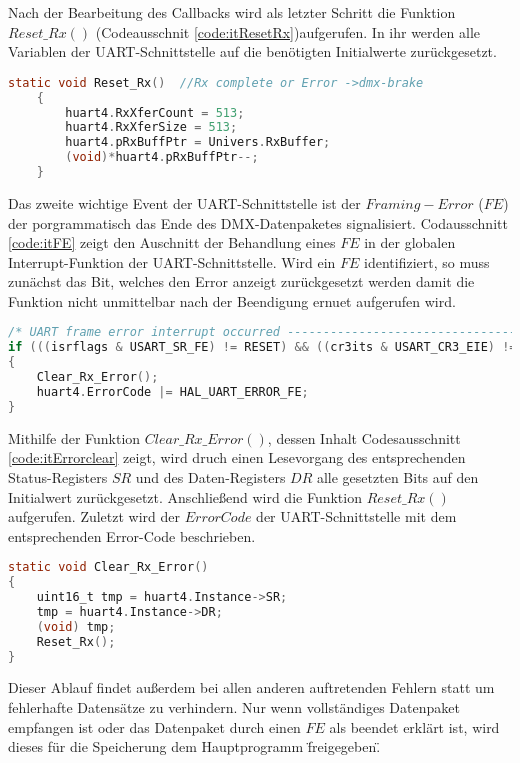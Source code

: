 Nach der Bearbeitung des Callbacks wird als letzter Schritt die Funktion $Reset\_Rx()$ (Codeausschnit \ref{code:itResetRx})aufgerufen. In ihr werden alle Variablen der UART-Schnittstelle auf die benötigten Initialwerte zurückgesetzt.
\begin{lstlisting}[caption = stm32f4xx\_it.c: UART Reset\_Rx(),
	label = code:itResetRx, 
	language = C, 
	firstnumber = 434]
	static void Reset_Rx()	//Rx complete or Error ->dmx-brake
	{
		huart4.RxXferCount = 513;
		huart4.RxXferSize = 513;
		huart4.pRxBuffPtr = Univers.RxBuffer;
		(void)*huart4.pRxBuffPtr--;
	}
\end{lstlisting}
Das zweite wichtige Event der UART-Schnittstelle ist der $Framing-Error$ ($FE$) der porgrammatisch das Ende des DMX-Datenpaketes signalisiert. Codausschnitt \ref{code:itFE} zeigt den Auschnitt der Behandlung eines $FE$ in der globalen Interrupt-Funktion der UART-Schnittstelle. Wird ein $FE$ identifiziert, so muss zunächst das Bit, welches den Error anzeigt zurückgesetzt werden damit die Funktion nicht unmittelbar nach der Beendigung ernuet aufgerufen wird.
\begin{lstlisting}[caption = stm32f4xx\_it.c: UART Framing Error,
	label = code:itFE, 
	language = C, 
	firstnumber = 349]
/* UART frame error interrupt occurred -----------------------------------*/
if (((isrflags & USART_SR_FE) != RESET) && ((cr3its & USART_CR3_EIE) != RESET))
{
	Clear_Rx_Error();
	huart4.ErrorCode |= HAL_UART_ERROR_FE;
}
\end{lstlisting}
Mithilfe der Funktion $Clear\_Rx\_Error()$, dessen Inhalt Codesausschnitt \ref{code:itErrorclear} zeigt, wird druch einen Lesevorgang des entsprechenden Status-Registers $SR$ und des Daten-Registers $DR$ alle gesetzten Bits auf den Initialwert zurückgesetzt. Anschließend wird die Funktion $Reset\_Rx()$ aufgerufen. Zuletzt wird der $ErrorCode$ der UART-Schnittstelle mit dem entsprechenden Error-Code beschrieben. 
\begin{lstlisting}[caption = stm32f4xx\_it.c: UART Clear\_Rx\_Error(),
	label = code:itErrorclear, 
	language = C, 
	firstnumber = 426]
static void Clear_Rx_Error()
{
	uint16_t tmp = huart4.Instance->SR;
	tmp = huart4.Instance->DR;
	(void) tmp;
	Reset_Rx();
}
\end{lstlisting}
Dieser Ablauf findet außerdem bei allen anderen auftretenden Fehlern statt um fehlerhafte Datensätze zu verhindern. Nur wenn vollständiges Datenpaket empfangen ist oder das Datenpaket durch einen $FE$ als beendet erklärt ist, wird dieses für die Speicherung dem Hauptprogramm \"freigegeben\".\\
